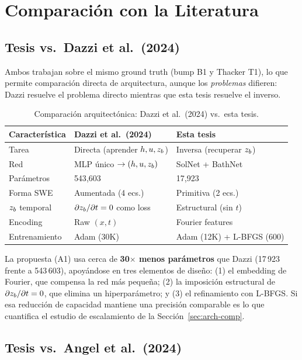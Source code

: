 \section{Comparación con la Literatura}
\label{sec:comp}

\subsection{Tesis vs.\ Dazzi et al.\ (2024)}

Ambos trabajan sobre el mismo ground truth (bump B1 y Thacker T1), lo que
permite comparación directa de arquitectura, aunque los \emph{problemas}
difieren: Dazzi resuelve el problema directo mientras que esta tesis
resuelve el inverso.

\begin{table}[H]
\centering
\caption{Comparación arquitectónica: Dazzi et al.\ (2024) vs.\ esta tesis.}
\label{tab:dazzi-comp}
\begin{tabular}{lll}
\toprule
Característica & Dazzi et al.\ (2024) & Esta tesis \\
\midrule
Tarea & Directa (aprender $h, u, z_b$) & Inversa (recuperar $z_b$) \\
Red & MLP único $\to (h, u, z_b)$ & SolNet + BathNet \\
Parámetros & 543{,}603 & 17{,}923 \\
Forma SWE & Aumentada (4 ecs.) & Primitiva (2 ecs.) \\
$z_b$ temporal & $\partial z_b/\partial t = 0$ como loss & Estructural (sin $t$) \\
Encoding & Raw $(x,t)$ & Fourier features \\
Entrenamiento & Adam (30K) & Adam (12K) + L-BFGS (600) \\
\bottomrule
\end{tabular}
\end{table}

La propuesta (A1) usa cerca de \textbf{30$\times$ menos parámetros} que Dazzi
(17\,923 frente a 543\,603), apoyándose en tres elementos de diseño: (1) el
embedding de Fourier, que compensa la red más pequeña; (2) la imposición
estructural de $\partial z_b / \partial t = 0$, que elimina un hiperparámetro;
y (3) el refinamiento con L-BFGS. Si esa reducción de capacidad mantiene una
precisión comparable es lo que cuantifica el estudio de escalamiento de la
Sección~\ref{sec:arch-comp}. 

\subsection{Tesis vs.\ Angel et al.\ (2024)}

